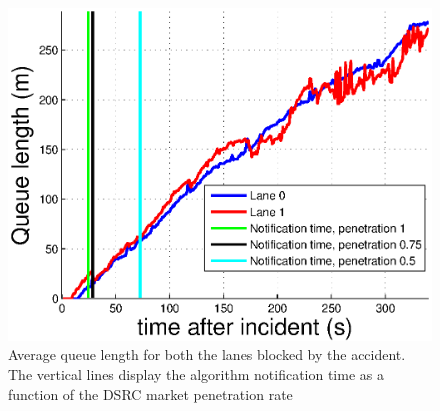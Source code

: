 \documentclass[conference]{IEEEtran}
\begin{document}
\begin{figure}[tbhp]
\begin{center}
\includegraphics[width=.8\columnwidth]{./fig/stampa_code.eps}
\caption{Average queue length for both the lanes blocked by the accident. The vertical lines display the algorithm  notification time as a function of the DSRC market penetration rate}
\label{fig:code}
\end{center}
\end{figure}
\end{document}
